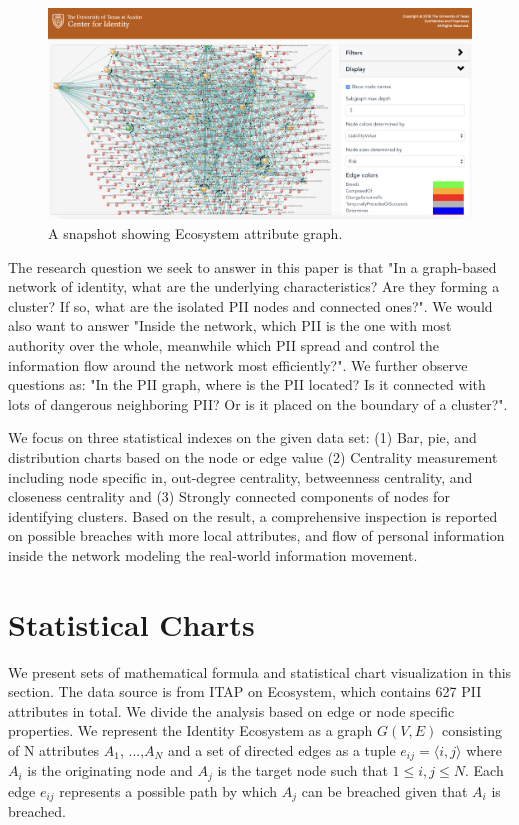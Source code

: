 \documentclass[conference]{IEEEtran}
\begin{document}
\begin{figure}[ht]
  \includegraphics[width=\linewidth]{ecosystem_snapshot.png}
  \caption{A snapshot showing Ecosystem attribute graph.}
  \label{fig:ecosystem_snapshot}
\end{figure}

 The research question we seek to answer in this paper is that "In a graph-based network of identity, what are the underlying characteristics? Are they forming a cluster? If so, what are the isolated PII nodes and connected ones?". We would also want to answer "Inside the network, which PII is the one with most authority over the whole, meanwhile which PII spread and control the information flow around the network most efficiently?". We further observe questions as: "In the PII graph, where is the PII located? Is it connected with lots of dangerous neighboring PII? Or is it placed on the boundary of a cluster?".

We focus on three statistical indexes on the given data set: (1) Bar, pie, and distribution charts based on the node or edge value (2) Centrality measurement including node specific in, out-degree centrality, betweenness centrality, and closeness centrality and (3) Strongly connected  components of nodes for identifying clusters. Based on the result, a comprehensive inspection is reported on possible breaches with more local attributes, and flow of personal information inside the network modeling the real-world information movement. 



\section{Statistical Charts}

We present sets of mathematical formula and statistical chart visualization in this section. The data source is from ITAP on Ecosystem, which contains 627 PII attributes in total. We divide the analysis based on edge or node specific properties. We represent the Identity Ecosystem as a graph $G(V, E)$ consisting of N attributes $A_{1}$, ...,$A_{N}$ and a set of directed edges as a tuple $e_{ij} = \langle i, j \rangle$ where $A_{i}$ is the originating node and $A_{j}$ is the target node such that $1 \leq i, j \leq N$. Each edge $e_{ij}$ represents a possible path by which $A_{j}$ can be breached given that $A_{i}$ is breached.
\end{document}
